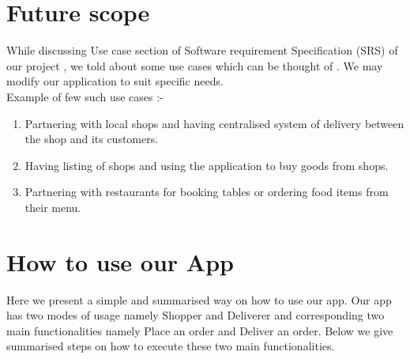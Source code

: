 \documentclass{report}
\begin{document}
\chapter{Future scope}
While discussing Use case section of Software requirement Specification (SRS) of our project , we told about some use cases which can be thought of .
We may modify our application to suit specific needs.\\

Example of few such use cases :-
\begin{enumerate}[label=\Roman*]
\item Partnering with local shops and having centralised system of delivery between the shop and its customers. 
\item Having listing of shops and using the application to buy goods from shops.
\item Partnering with restaurants for booking tables or ordering food items from their menu.

\end{enumerate}

\chapter{How to use our App}
Here we present a simple and summarised way on how to use our app.
Our app has two modes of usage namely Shopper and Deliverer and corresponding two main functionalities namely Place an order and Deliver an order.
    Below we give summarised steps on how to execute these two main functionalities.
\end{document}
